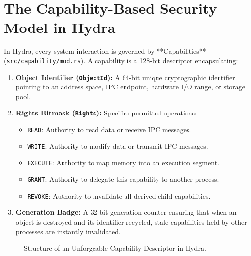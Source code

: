 \section{The Capability-Based Security Model in Hydra}
\label{sec:capability_model}

In Hydra, every system interaction is governed by **Capabilities** (\texttt{src/capability/mod.rs}). A capability is a 128-bit descriptor encapsulating:
\begin{enumerate}
    \item \textbf{Object Identifier (\texttt{ObjectId}):} A 64-bit unique cryptographic identifier pointing to an address space, IPC endpoint, hardware I/O range, or storage pool.
    \item \textbf{Rights Bitmask (\texttt{Rights}):} Specifies permitted operations:
    \begin{itemize}
        \item \texttt{READ}: Authority to read data or receive IPC messages.
        \item \texttt{WRITE}: Authority to modify data or transmit IPC messages.
        \item \texttt{EXECUTE}: Authority to map memory into an execution segment.
        \item \texttt{GRANT}: Authority to delegate this capability to another process.
        \item \texttt{REVOKE}: Authority to invalidate all derived child capabilities.
    \end{itemize}
    \item \textbf{Generation Badge:} A 32-bit generation counter ensuring that when an object is destroyed and its identifier recycled, stale capabilities held by other processes are instantly invalidated.
\end{enumerate}

\begin{figure}[htbp]
\centering
{}
\caption{Structure of an Unforgeable Capability Descriptor in Hydra.}
\label{fig:cap_descriptor}
\end{figure}

